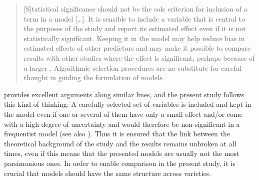\begin{quote}
[S]tatistical significance should not be the sole criterion for inclusion of a term in a model […]. It is sensible to include a variable that is central to the purposes of the study and report its estimated effect even if it is not statistically significant. Keeping it in the model may help reduce bias in estimated effects of other predictors and may make it possible to compare results with other studies where the effect is significant, perhaps because of a larger . Algorithmic selection procedures are no substitute for careful thought in guiding the formulation of models.
\end{quote}

\citet[276–279]{Winter2020} provides excellent arguments along similar lines, and the present study follows this kind of thinking: A carefully selected set of variables is included and kept in the model even if one or several of them have only a small effect and/or come with a high degree of uncertainty and would therefore be non-significant in a frequentist model (see also \citealt{Tizón-CoutoLorenz2021}). Thus it is ensured that the link between the theoretical background of the study and the results remains unbroken at all times, even if this means that the presented models are usually not the most parsimonious ones. In order to enable comparison in the present study, it is crucial that models should have the same structure across varieties.

